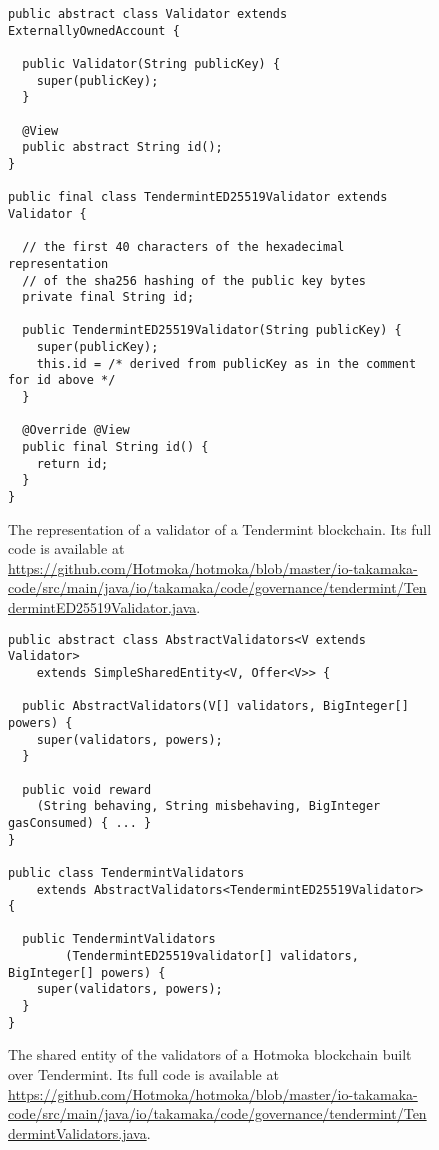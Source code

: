 \begin{figure}[t]
  \begin{center}
    \begin{lstlisting}[language=Takamaka]
public abstract class Validator extends ExternallyOwnedAccount {

  public Validator(String publicKey) {
    super(publicKey);
  }

  @View
  public abstract String id();
}

public final class TendermintED25519Validator extends Validator {

  // the first 40 characters of the hexadecimal representation
  // of the sha256 hashing of the public key bytes
  private final String id;

  public TendermintED25519Validator(String publicKey) {
    super(publicKey);
    this.id = /* derived from publicKey as in the comment for id above */
  }

  @Override @View
  public final String id() {
    return id;
  }
}
    \end{lstlisting}
  \end{center}
  \caption{The representation of a validator of a Tendermint blockchain.
  Its full code is available at \url{https://github.com/Hotmoka/hotmoka/blob/master/io-takamaka-code/src/main/java/io/takamaka/code/governance/tendermint/TendermintED25519Validator.java}.}\label{fig:validator}
\end{figure}

\begin{figure}[t]
  \begin{center}
    \begin{lstlisting}[language=Takamaka]
public abstract class AbstractValidators<V extends Validator>
    extends SimpleSharedEntity<V, Offer<V>> {

  public AbstractValidators(V[] validators, BigInteger[] powers) {
    super(validators, powers);
  }

  public void reward
    (String behaving, String misbehaving, BigInteger gasConsumed) { ... }
}

public class TendermintValidators
    extends AbstractValidators<TendermintED25519Validator> {

  public TendermintValidators
        (TendermintED25519validator[] validators, BigInteger[] powers) {
    super(validators, powers);
  }
}
    \end{lstlisting}
  \end{center}
  \caption{The shared entity of the validators of a Hotmoka blockchain built over Tendermint.
  Its full code is available at \url{https://github.com/Hotmoka/hotmoka/blob/master/io-takamaka-code/src/main/java/io/takamaka/code/governance/tendermint/TendermintValidators.java}.}\label{fig:tendermint_validators}
\end{figure}

